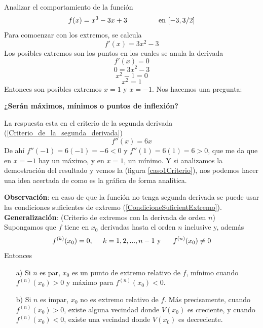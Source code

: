 \documentclass[10pt,twoside]{SelfArx} %
\begin{document}
   \begin{ejemplo}
   	Analizar el comportamiento de la función
   	\begin{equation}
   	f(x)=x^{3}-3x+3 \;\;\;\;\;\;\;\;\;\;\;\;\;\;\;\;\mbox{en $ [-3,3/2] $}
   	\end{equation}
   	Para comoenzar con  los extremos, se calcula
   	\begin{equation}
   	f'(x)=3x^{2}-3
   	\end{equation}
   	Los posibles extremos son los puntos en los cuales se anula la derivada
   	\begin{equation}
   	f'(x)=0
   	\end{equation}
   	\begin{equation}
	0=3x^{2}-3
   	\end{equation}
   	\begin{equation}
   	x^{2}-1=0
   	\end{equation}
   	\begin{equation}
   	x^{2}=1
   	\end{equation}
   	Entonces son posibles extremos $ x=1 $ y $ x=-1 $.
   	Nos hacemos una pregunta:
   	\begin{center}
   		\textbf{¿Serán máximos, mínimos o puntos de inflexión?}
   	\end{center}
   	La respuesta esta en el criterio de la segunda derivada (\ref{Criterio_de_la_segunda_derivada})
   	\begin{equation}
   	f''(x)=6x
   	\end{equation}
   	De ahí $ 	f''(-1)=6(-1)=-6<0 $ y $ f''(1)=6(1)=6>0 $, que me da que en $ x=-1 $ hay un máximo, y en $ x=1 $, un mínimo. Y si analizamos la demostración del resultado y vemos la (figura \ref{caso1Criterio}), nos podemos hacer una idea acertada de como es la gráfica de forma analítica.
   \end{ejemplo}
    \textbf{Observación}: en caso de que la función no tenga segunda derivada se puede usar las condiciones suficientes de extremo (\ref{CondicioneSuficientExtremo}).
    \textbf{Generalización}: (Criterio de extremos con la derivada de orden $ n $)\\
    Supongamos que $ f $ tiene en $ x_{0} $ derivadas hasta el orden $ n $ inclusive y, adem\'as
    \[ f^{(k)}(x_{0})=0,\;\;\;\;\; \mbox{$ k=1,2,...,n-1 $ y }\;\;\;\;\; f^{(n)}(x_{0})\neq0 \]
    Entonces
    \begin{enumerate}
    	\item [a)]	Si $ n $ es par, $ x_{0} $ es un punto de extremo relativo  de $ f $, mínimo cuando $ f^{(n)}(x_{0})>0 $ y máximo para $ f^{(n)}(x_{0})<0 $.
    	
    	\item [b)]	Si $ n $ es impar, $ x_{0} $ no es  extremo relativo  de $ f $. Más precisamente, cuando $ f^{(n)}(x_{0})>0 $, existe alguna vecindad donde $ V(x_{0}) $ es creciente, y cuando $ f^{(n)}(x_{0})<0 $, existe una vecindad donde $ V(x_{0}) $ es decreciente.
    \end{enumerate}
    
\end{document}
